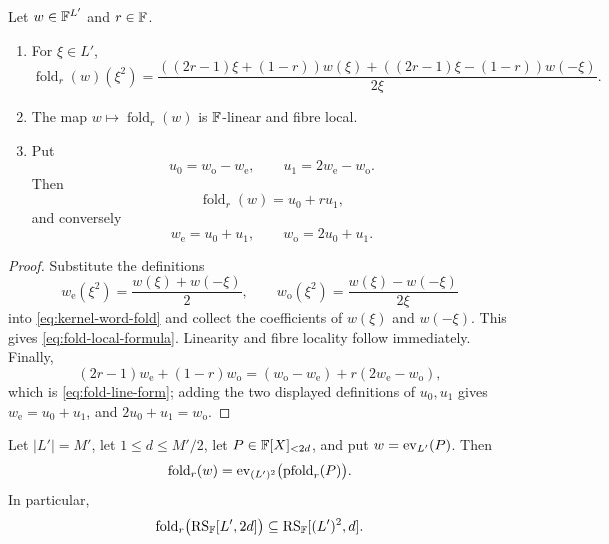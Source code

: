\begin{lemma}
\label{lem:fold-local-line}
Let $w\in\mathbb{F}^{L'}$ and $r\in\mathbb{F}$.
\begin{enumerate}[label=(\arabic*),leftmargin=*]
  \item For $\xi\in L'$,
  \begin{equation}
  \operatorname{fold}_r(w)(\xi^2)
  =
  \frac{((2r-1)\xi+(1-r))w(\xi)
       +((2r-1)\xi-(1-r))w(-\xi)}{2\xi}.
  \label{eq:fold-local-formula}
  \end{equation}
  \item The map $w\mapsto\operatorname{fold}_r(w)$ is $\mathbb{F}$-linear and fibre local.
  \item Put
  \[
    u_0=w_{\mathrm o}-w_{\mathrm e},
    \qquad
    u_1=2w_{\mathrm e}-w_{\mathrm o}.
  \]
  Then
  \begin{equation}
    \operatorname{fold}_r(w)=u_0+ru_1,
    \label{eq:fold-line-form}
  \end{equation}
  and conversely
  \[
    w_{\mathrm e}=u_0+u_1,
    \qquad
    w_{\mathrm o}=2u_0+u_1.
  \]
\end{enumerate}
\end{lemma}

\begin{proof}
Substitute the definitions
\[
  w_{\mathrm e}(\xi^2)=\frac{w(\xi)+w(-\xi)}2,
  \qquad
  w_{\mathrm o}(\xi^2)=\frac{w(\xi)-w(-\xi)}{2\xi}
\]
into \eqref{eq:kernel-word-fold} and collect the coefficients of $w(\xi)$ and $w(-\xi)$.  This gives \eqref{eq:fold-local-formula}.  Linearity and fibre locality follow immediately.  Finally,
\[
  (2r-1)w_{\mathrm e}+(1-r)w_{\mathrm o}
  =(w_{\mathrm o}-w_{\mathrm e})
   +r(2w_{\mathrm e}-w_{\mathrm o}),
\]
which is \eqref{eq:fold-line-form}; adding the two displayed definitions of $u_0,u_1$ gives $w_{\mathrm e}=u_0+u_1$, and $2u_0+u_1=w_{\mathrm o}$.
\end{proof}

\begin{proposition}
\label{prop:fold-consistency}
Let $|L'|=M'$, let $1\le d\le M'/2$, let $P\in\mathbb{F}[X]_{<2d}$, and put $w=\operatorname{ev}_{L'}(P)$.  Then
\begin{equation}
  \operatorname{fold}_r(w)
  =
  \operatorname{ev}_{(L')^2}\bigl(\operatorname{pfold}_r(P)\bigr).
  \label{eq:fold-consistency}
\end{equation}
In particular,
\[
  \operatorname{fold}_r\bigl(\operatorname{RS}_{\mathbb{F}}[L',2d]\bigr)
  \subseteq
  \operatorname{RS}_{\mathbb{F}}[(L')^2,d].
\]
\end{proposition}

